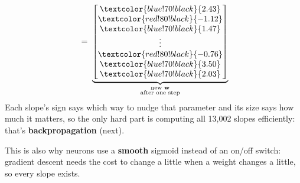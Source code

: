 \begin{keeptogether}
\begin{keeptogether}
\[\;=\;
\underbrace{\begin{bmatrix} \textcolor{blue!70!black}{2.43} \\ \textcolor{red!80!black}{-1.12} \\ \textcolor{blue!70!black}{1.47} \\ \vdots \\ \textcolor{red!80!black}{-0.76} \\ \textcolor{blue!70!black}{3.50} \\ \textcolor{blue!70!black}{2.03} \end{bmatrix}}_{\substack{\text{new } \mathbf{w}\\ \text{after one step}}}
\]
Each slope's sign says which way to nudge that parameter and its size says how much it matters, so the only hard part is computing all 13{,}002 slopes efficiently: that's \textbf{backpropagation} (next).
\end{keeptogether}
\end{keeptogether}

This is also why neurons use a \textbf{smooth} sigmoid instead of an on/off switch: gradient descent needs the cost to change a little when a weight changes a little, so every slope exists.


